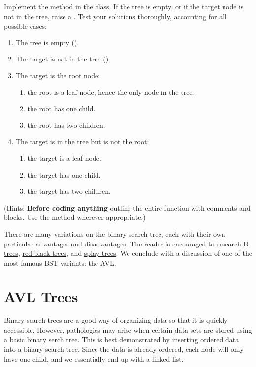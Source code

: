 \begin{problem}
Implement the  method in the  class.
If the tree is empty, or if the target node is not in the tree, raise a .
Test your solutions thoroughly, accounting for all possible cases:
\begin{enumerate}
\item The tree is empty ().
\item The target is not in the tree ().
\item The target is the root node:
	\begin{enumerate}
	\item the root is a leaf node, hence the only node in the tree.
	\item the root has one child.
	\item the root has two children.
	\end{enumerate}
\item The target is in the tree but is not the root:
	\begin{enumerate}
	\item the target is a leaf node.
	\item the target has one child.
	\item the target has two children.
	\end{enumerate}
\end{enumerate}
(Hints: \textbf{Before coding anything} outline the entire function with comments and  blocks.
Use the  method wherever appropriate.)
\end{problem}

There are many variations on the binary search tree, each with their own particular advantages and disadvantages.
The reader is encouraged to research \href{https://en.wikipedia.org/wiki/B-tree}{B-trees}, \href{https://en.wikipedia.org/wiki/Red%E2%80%93black_tree}{red-black trees}, and \href{https://en.wikipedia.org/wiki/Splay_tree}{splay trees}.
We conclude with a discussion of one of the most famous BST variants: the AVL.

\section*{AVL Trees}

Binary search trees are a good way of organizing data so that it is quickly accessible.
However, pathologies may arise when certain data sets are stored using a basic binary serch tree.
This is best demonstrated by inserting ordered data into a binary search tree.
Since the data is already ordered, each node will only have one child, and we essentially end up with a linked list.

